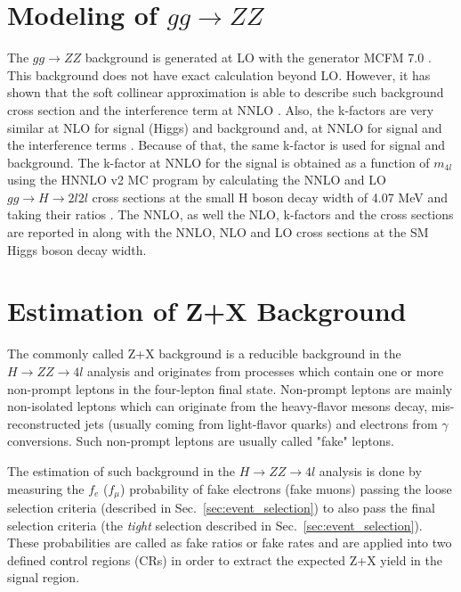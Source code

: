 \section{Modeling of $gg \rightarrow ZZ$}
\label{sec:ggzz_modeling}
The $gg \rightarrow ZZ$ background is generated at LO with the generator MCFM 7.0 \cite{bib:NPPS-10-205}. This background does not have exact calculation beyond LO. However, it has shown that the soft collinear approximation is able to describe such background cross section and the interference term at NNLO \cite{bib:PhysRevD-88-2013-034032}. Also, the k-factors are very similar at NLO for signal (Higgs) and background \cite{bib:PhysLettB-774-2015-43} and, at NNLO for signal and the interference terms \cite{bib:JHEP-1508-2015-065}. Because of that, the same k-factor is used for signal and background. The k-factor at NNLO for the signal is obtained as a function of $m_{4l}$ using the HNNLO v2 MC program by calculating the NNLO and LO $gg \rightarrow H \rightarrow 2l2l$ cross sections at the small H boson decay width of 4.07 MeV and taking their ratios \cite{bib:PhysRevLett-98-2007-222002, bib:JHEP-02-2008-043, bib:JHEP-09-2013-129}. The NNLO, as well the NLO, k-factors and the cross sections are reported in \cite{bib:CMS-AN-16-442} along with the NNLO, NLO and LO cross sections at the SM Higgs boson decay width.

\section{Estimation of Z+X Background}
\label{sec:zx_estimation}
The commonly called Z+X background is a reducible background in the $H \rightarrow ZZ \rightarrow 4l$ analysis and originates from processes which contain one or more non-prompt leptons in the four-lepton final state. Non-prompt leptons are mainly non-isolated leptons which can originate from the heavy-flavor mesons decay, mis-reconstructed jets (usually coming from light-flavor quarks) and electrons from $\gamma$ conversions. Such non-prompt leptons are usually called "fake" leptons.

The estimation of such background in the $H \rightarrow ZZ \rightarrow 4l$ analysis is done by measuring the $f_{e}$ ($f_{\mu}$) probability of fake electrons (fake muons) passing the loose selection criteria (described in Sec.~\ref{sec:event_selection}) to also pass the final selection criteria (the \textit{tight} selection described in Sec.~\ref{sec:event_selection}). These probabilities are called as fake ratios or fake rates and are applied into two defined control regions (CRs) in order to extract the expected Z+X yield in the signal region.

